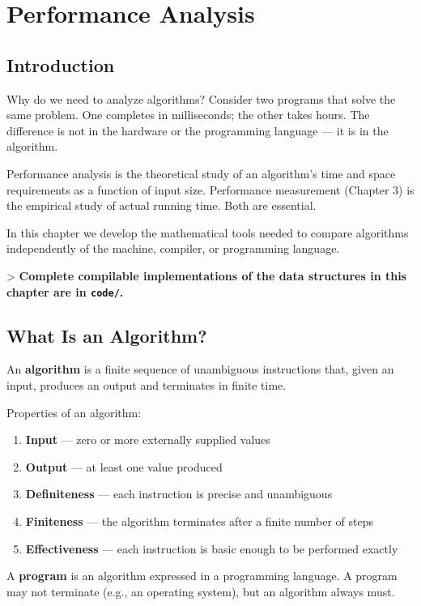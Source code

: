 \chapter{Performance Analysis}\label{ch02:performance-analysis}

\section{Introduction}

Why do we need to analyze algorithms? Consider two programs that solve the same problem. One completes in milliseconds; the other takes hours. The difference is not in the hardware or the programming language — it is in the algorithm.

Performance analysis is the theoretical study of an algorithm's time and space requirements as a function of input size. Performance measurement (Chapter 3) is the empirical study of actual running time. Both are essential.

In this chapter we develop the mathematical tools needed to compare algorithms independently of the machine, compiler, or programming language.

> \textbf{Complete compilable implementations of the data structures in this chapter are in \texttt{code/}.}

\section{What Is an Algorithm?}

An \textbf{algorithm} is a finite sequence of unambiguous instructions that, given an input, produces an output and terminates in finite time.

Properties of an algorithm:
\begin{enumerate}
\item \textbf{Input} — zero or more externally supplied values
\item \textbf{Output} — at least one value produced
\item \textbf{Definiteness} — each instruction is precise and unambiguous
\item \textbf{Finiteness} — the algorithm terminates after a finite number of steps
\item \textbf{Effectiveness} — each instruction is basic enough to be performed exactly
\end{enumerate}

A \textbf{program} is an algorithm expressed in a programming language. A program may not terminate (e.g., an operating system), but an algorithm always must.

